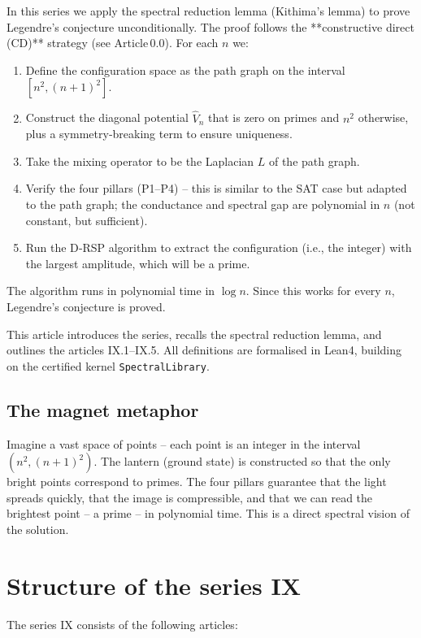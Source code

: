 \documentclass[11pt,a4paper]{article}
\begin{document}
In this series we apply the spectral reduction lemma (Kithima's lemma) to prove Legendre's conjecture unconditionally. The proof follows the **constructive direct (CD)** strategy (see Article 0.0). For each $n$ we:
\begin{enumerate}
\item Define the configuration space as the path graph on the interval $[n^2, (n+1)^2]$.
\item Construct the diagonal potential $\hat{V}_n$ that is zero on primes and $n^2$ otherwise, plus a symmetry‑breaking term to ensure uniqueness.
\item Take the mixing operator to be the Laplacian $L$ of the path graph.
\item Verify the four pillars (P1–P4) – this is similar to the SAT case but adapted to the path graph; the conductance and spectral gap are polynomial in $n$ (not constant, but sufficient).
\item Run the D‑RSP algorithm to extract the configuration (i.e., the integer) with the largest amplitude, which will be a prime.
\end{enumerate}
The algorithm runs in polynomial time in $\log n$. Since this works for every $n$, Legendre's conjecture is proved.

This article introduces the series, recalls the spectral reduction lemma, and outlines the articles IX.1–IX.5. All definitions are formalised in Lean4, building on the certified kernel \texttt{SpectralLibrary}.

\subsection{The magnet metaphor}

Imagine a vast space of points – each point is an integer in the interval $(n^2, (n+1)^2)$. The lantern (ground state) is constructed so that the only bright points correspond to primes. The four pillars guarantee that the light spreads quickly, that the image is compressible, and that we can read the brightest point – a prime – in polynomial time. This is a direct spectral vision of the solution.

\section{Structure of the series IX}

The series IX consists of the following articles:
\end{document}
